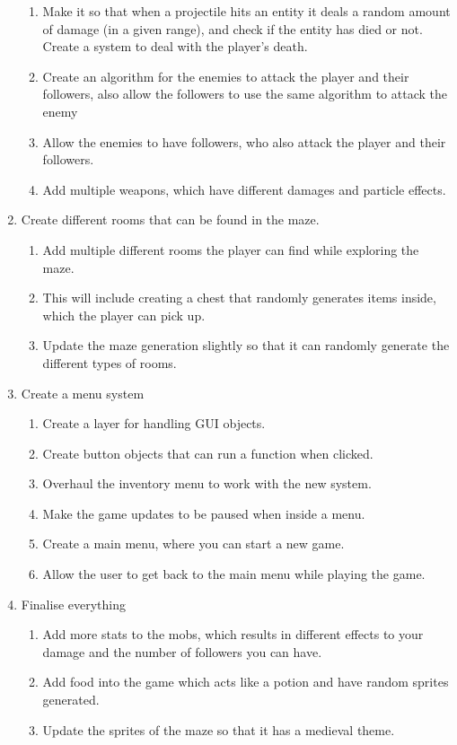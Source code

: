 \documentclass[../Main.tex]{subfiles}
\begin{document}
\begin{enumerate}
\begin{enumerate}
                    \item Make it so that when a projectile hits an entity it deals a random amount of damage (in a given range), and check if the entity has died or not. Create a system to deal with the player's death.
                    \item Create an algorithm for the enemies to attack the player and their followers, also allow the followers to use the same algorithm to attack the enemy
                    \item Allow the enemies to have followers, who also attack the player and their followers.
                    \item Add multiple weapons, which have different damages and particle effects.
                \end{enumerate}
            \item Create different rooms that can be found in the maze.
                \begin{enumerate}
                    \item Add multiple different rooms the player can find while exploring the maze.
                    \item This will include creating a chest that randomly generates items inside, which the player can pick up.
                    \item Update the maze generation slightly so that it can randomly generate the different types of rooms.
                \end{enumerate}
            \item Create a menu system
                \begin{enumerate}
                    \item Create a layer for handling GUI objects.
                    \item Create button objects that can run a function when clicked.
                    \item Overhaul the inventory menu to work with the new system.
                    \item Make the game updates to be paused when inside a menu.
                    \item Create a main menu, where you can start a new game.
                    \item Allow the user to get back to the main menu while playing the game.
                \end{enumerate}
            \item Finalise everything
                \begin{enumerate}
                    \item Add more stats to the mobs, which results in different effects to your damage and the number of followers you can have.
                    \item Add food into the game which acts like a potion and have random sprites generated.
                    \item Update the sprites of the maze so that it has a medieval theme.
                \end{enumerate}
        \end{enumerate}
\end{document}

